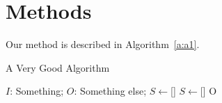 \chapter{Methods}
\label{c:method}

Our method is described in Algorithm~\ref{a:a1}.

\begin{algorithm}
    \caption{A Very Good Algorithm}
    \label{a:a1}
    \begin{algorithmic}[1]
        \Require  
            $I$: Something;
        \Ensure
            $O$: Something else;
        \State $S\gets$[]
            \State $S\gets$[]
        \EndFor
        \State \Return O
    \end{algorithmic}
\end{algorithm}
